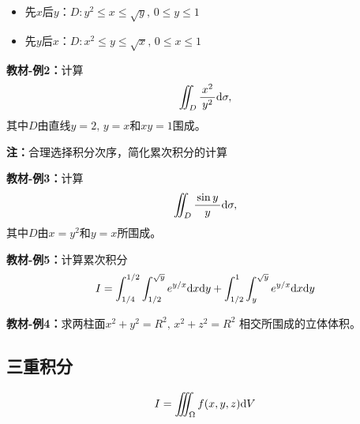 \begin{itemize}
  \setlength{\itemindent}{1cm}
  \item {先$x$后$y$：}$D:y^2\leq x\leq\sqrt y,\,0\leq y\leq 1$ 
  \item {先$y$后$x$：}$D:x^2\leq y\leq\sqrt x,\,0\leq x\leq 1$
\end{itemize}

{\bf 教材-例2：}计算
$$\iint_D\displaystyle\frac{\,{x^2}\,}{\,{y^2}\,}\mathrm{d}\sigma,$$
其中$D$由直线$y=2,\,y=x$和$xy=1$围成。

{\bf 注：}合理选择积分次序，简化累次积分的计算

{\bf 教材-例3：}计算
$$\iint_D\displaystyle\frac{\,{\sin y}\,}{\,{y}\,}\mathrm{d}\sigma,$$
其中$D$由$x=y^2$和$y=x$所围成。

{\bf 教材-例5：}计算累次积分
$$I=\int_{1/4}^{1/2}\int_{1/2}^{\sqrt y}e^{y/x}\mathrm{d} x\mathrm{d} y+
\int_{1/2}^1\int_y^{\sqrt y}e^{y/x}\mathrm{d} x\mathrm{d} y$$

{\bf 教材-例4：}求两柱面$x^2+y^2=R^2,\, x^2+z^2=R^2$
相交所围成的立体体积。

\begin{center}
\end{center}

\subsection{三重积分}

$${I=\iiint_{\Omega}f(x,y,z)\mathrm{d} V}$$

